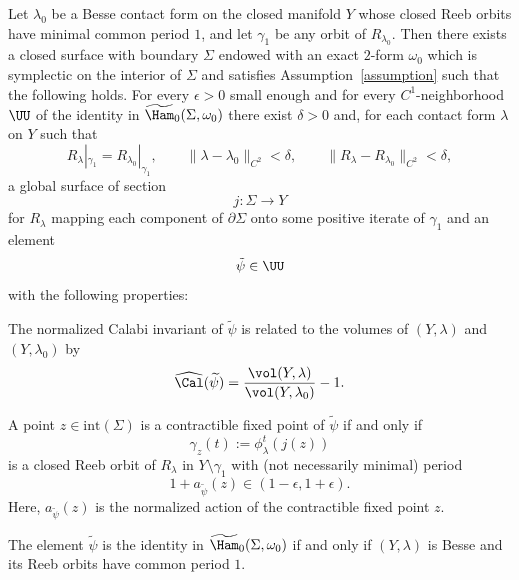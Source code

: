 \begin{prop}
\label{p:sum_up}
Let $\lambda_0$ be a Besse contact form on the closed manifold $Y$ whose closed Reeb orbits have minimal common period $1$, and let $\gamma_1$ be any orbit of $R_{\lambda_0}$. Then there exists a closed surface with boundary $\Sigma$ endowed with an exact $2$-form $\omega_0$ which is symplectic on the interior of $\Sigma$ and satisfies Assumption~\ref{assumption} such that the following holds. For every $\epsilon>0$ small enough and for every $C^1$-neighborhood $\UU$ of the identity in $\widetilde{\Ham}_0(\Sigma,\omega_0)$ there exist $\delta>0$ and, for each contact form $\lambda$ on $Y$ such that
\[
R_\lambda|_{\gamma_1}=R_{\lambda_0}|_{\gamma_1}, \qquad \|\lambda-\lambda_0\|_{C^2} < \delta, \qquad \|R_{\lambda} - R_{\lambda_0}\|_{C^2} < \delta,
\]
a global surface of section
\[
j:\Sigma\to Y
\]
for $R_{\lambda}$ mapping each component of $\partial \Sigma$ onto some positive iterate of $\gamma_1$ and an element
\[
\tilde\psi\in\UU
\]
with the following properties:
\begin{enumeratei}

\item\label{p:sum_upi}
The normalized Calabi invariant of $\tilde\psi$ is related to the volumes of $(Y,\lambda)$ and $(Y,\lambda_0)$ by
\[
\widehat{\Cal}(\widetilde\psi) = \frac{\vol(Y,\lambda)}{\vol(Y,\lambda_0)} - 1.
\]

\item\label{p:sum_upii}
A point $z\in \mathrm{int}(\Sigma)$ is a contractible fixed point of $\tilde\psi$ if and only if
\[
\gamma_z(t):=\phi_\lambda^t(j(z))
\] is a closed Reeb orbit of $R_{\lambda}$ in $Y\setminus\gamma_1$ with (not necessarily minimal) period
\[
1+a_{\tilde\psi}(z)\in(1-\epsilon,1+\epsilon).
\]
Here, $a_{\tilde\psi}(z)$ is the normalized action of the contractible fixed point $z$.

\item\label{p:sum_upiii}
The element $\tilde\psi$ is the identity in $\widetilde{\Ham}_0(\Sigma,\omega_0)$ if and only if $(Y,\lambda)$ is Besse and its Reeb orbits have common period $1$.
\end{enumeratei}
\end{prop}

